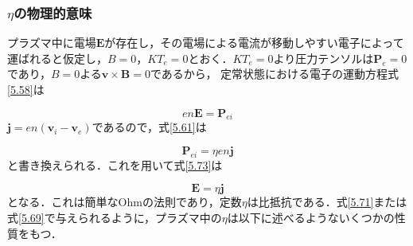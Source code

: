 \documentclass{ltjsarticle}
\numberwithin{equation}{section} %
\begin{document}
\subsubsection{$\eta$の物理的意味} \label{section5.6.3}
プラズマ中に電場$\bm{E}$が存在し，その電場による電流が移動しやすい電子によって運ばれると仮定し，$B=0$，$KT_e=0$とおく．$KT_e=0$より圧力テンソルは$\bm{P}_e=0$であり，$B=0$よる$\bm{v}\times \bm{B}=0$であるから，
定常状態における電子の運動方程式\eqref{5.58}は

\begin{equation}
  en\bm{E} = \bm{P}_{ei} \label{5.73}
\end{equation}
$\bm{j} = en(\bm{v}_i-\bm{v}_e)$であるので，式\eqref{5.61}は

\begin{equation}
  \bm{P}_{ei} = \eta en\bm{j} \label{5.74}
\end{equation}
と書き換えられる．これを用いて式\eqref{5.73}は

\begin{equation}
  \bm{E} = \eta \bm{j} \label{5.75}
\end{equation}
となる．これは簡単なOhmの法則であり，定数$\eta$は比抵抗である．式\eqref{5.71}または式\eqref{5.69}で与えられるように，プラズマ中の$\eta$は以下に述べるようないくつかの性質をもつ．
\end{document}
